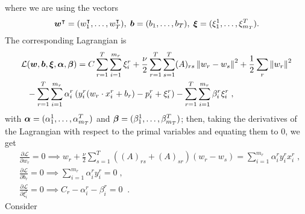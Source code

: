 where we are using the vectors
\begin{equation}
    \nonumber
    \bm{w}^\intercal = (w_1^\intercal, \ldots, w_T^\intercal), \; \bm{b} = (b_1, \ldots, b_T), \; \bm{\xi} = (\xi_{1}^1, \ldots, \xi_{m_T}^T).
\end{equation}
The corresponding Lagrangian is
\begin{equation}\label{eq:svmmtl_lagr_GL_addreg}
    \begin{aligned}
        \mathcal{L} & (\fv{w}, \fv{b}, \fv{\xi}, \fv{\alpha}, \fv{\beta}) = C \sum_{r=1}^T \sum_{i=1}^{m_r}{\xi_{i}^r} + \frac{\nu}{2} \sum_{r=1}^T \sum_{s=1}^T (A)_{rs} \norm{w_r - w_s}^2 + \frac{1}{2} \sum_r \norm{w_r}^2 \\
                    & - \sum_{r=1}^T \sum_{i=1}^{m_r}{ \alpha_i^r \left( y_{i}^r (w_r \cdot x_{i}^r + b_r) - p_{i}^r + \xi_{i}^r \right)  } - \sum_{r=1}^T \sum_{i=1}^{m_r}{ \beta_i^r \xi_i^r } \; ,
    \end{aligned}
\end{equation}
with $\bm{\alpha} = (\alpha_{1}^1, \ldots, \alpha_{m_T}^T)$ and $\bm{\beta} = (\beta_{1}^1, \ldots, \beta_{m_T}^T)$;
then, taking the derivatives of the Lagrangian with respect to the primal variables and equating them to $0$, we get
\begin{align}
     & \frac{\partial \mathcal{L}}{\partial w_r} = 0 \implies  w_r + \frac{\nu}{2} \sum_{s=1}^T ((A)_{rs} + (A)_{sr}) (w_r - w_s)= \sum_{i=1}^{m_r}{\alpha_i^r y_i^r x_i^r} \label{eq:partial_w_r_addreg} \; , \\
     & \frac{\partial \mathcal{L}}{\partial b_r} = 0 \implies  \sum_{i=1}^{m_r}{\alpha_i^r y_i^r } = 0 \label{eq:partial_b_r_addreg} \; ,                                                                        \\
     & \frac{\partial \mathcal{L}}{\partial \xi_i^r} = 0 \implies C_r - \alpha_i^r - \beta_i^r = 0 \; \label{eq:partial_xi_addreg}\; .
\end{align}
Consider
